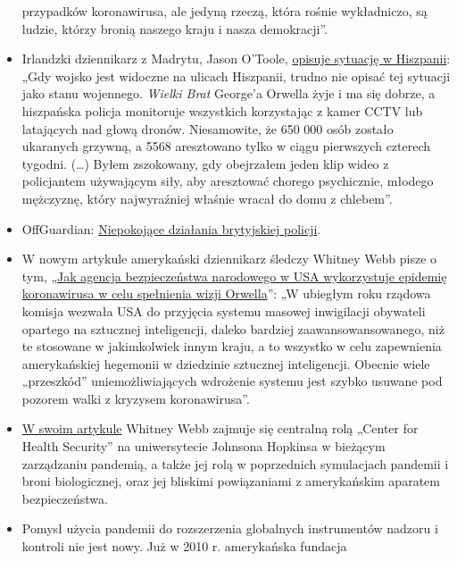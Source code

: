 \begin{itemize}
  przypadków koronawirusa, ale jedyną rzeczą, która rośnie wykładniczo,
  są ludzie, którzy bronią naszego kraju i nasza demokracji''.
\item
  Irlandzki dziennikarz z Madrytu, Jason O'Toole,
  \href{https://www.rt.com/op-ed/486350-spain-tough-rules-covid-19-lockdown/}{opisuje
  sytuację w Hiszpanii}: „Gdy wojsko jest widoczne na ulicach Hiszpanii,
  trudno nie opisać tej sytuacji jako stanu wojennego. \emph{Wielki
  Brat} George'a Orwella żyje i ma się dobrze, a hiszpańska policja
  monitoruje wszystkich korzystając z kamer CCTV lub latających nad
  głową dronów. Niesamowite, że 650 000 osób zostało ukaranych grzywną,
  a 5568 aresztowano tylko w ciągu pierwszych czterech tygodni.
  (\ldots{}) Byłem zszokowany, gdy obejrzałem jeden klip wideo z
  policjantem używającym siły, aby aresztować chorego psychicznie,
  młodego mężczyznę, który najwyraźniej właśnie wracał do domu z
  chlebem''.
\item
  OffGuardian:
  \href{https://off-guardian.org/2020/04/18/the-disturbing-developments-in-uk-policing/}{Niepokojące
  działania brytyjskiej policji}.
\item
  W nowym artykule amerykański dziennikarz śledczy Whitney Webb pisze o
  tym,
  „\href{https://www.thelastamericanvagabond.com/top-news/techno-tyranny-how-us-national-security-state-using-coronavirus-fulfill-orwellian-vision/}{Jak
  agencja bezpieczeństwa narodowego w USA wykorzystuje epidemię
  koronawirusa w celu spełnienia wizji Orwella}'': „W ubiegłym roku
  rządowa komisja wezwała USA do przyjęcia systemu masowej inwigilacji
  obywateli opartego na sztucznej inteligencji, daleko bardziej
  zaawansowansowanego, niż te stosowane w jakimkolwiek innym kraju, a to
  wszystko w celu zapewnienia amerykańskiej hegemonii w dziedzinie
  sztucznej inteligencji. Obecnie wiele „przeszkód'' uniemożliwiających
  wdrożenie systemu jest szybko usuwane pod pozorem walki z kryzysem
  koronawirusa''.
\item
  \href{https://www.thelastamericanvagabond.com/top-news/all-roads-lead-dark-winter/}{W
  swoim artykule} Whitney Webb zajmuje się centralną rolą „Center for
  Health Security'' na uniwersytecie Johnsona Hopkinsa w bieżącym
  zarządzaniu pandemią, a także jej rolą w poprzednich symulacjach
  pandemii i broni biologicznej, oraz jej bliskimi powiązaniami z
  amerykańskim aparatem bezpieczeństwa.
\item
  Pomysł użycia pandemii do rozszerzenia globalnych instrumentów nadzoru
  i kontroli nie jest nowy. Już w 2010 r. amerykańska fundacja

\end{itemize}

